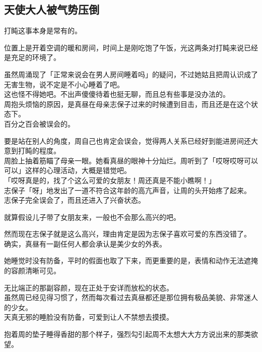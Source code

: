 \subsection{天使大人被气势压倒}

打盹这事本身是常有的。

位置上是开着空调的暖和房间，时间上是刚吃饱了午饭，光这两条对打盹来说已经是充足的环境了。

虽然周涌现了「正常来说会在男人房间睡着吗」的疑问，不过她姑且把周认识成了无害生物，说不定是不小心睡着了吧。\\

这也怪不得她吧。不出声傻傻待着也挺无聊，而且总有些事是没办法的。\\

周抱头烦恼的原因，是真昼在母亲志保子过来的时候遭到目击，而且还是在这个状态下。\\

百分之百会被误会的。

要是站在别人的角度，周自己也肯定会误会，觉得两人关系已经好到能进房间还大意到打盹的程度。\\

周脸上抽着筋瞄了母亲一眼。她看真昼的眼神十分灿烂。周听到了「哎呀哎呀可以可以」这样的心理活动，大概是错觉吧。\\

「哎呀真是的，找了个这么可爱的女朋友！周还真是不能小瞧啊！」\\

志保子「呀」地发出了一道不符合这年龄的高亢声音，让周的头开始疼了起来。\\

志保子完全误会了，而且还进入了兴奋状态。

就算假设儿子带了女朋友来，一般也不会那么高兴的吧。

然而现在志保子就是这么高兴，理由肯定是因为志保子喜欢可爱的东西没错了。\\

确实，真昼有一副任何人都会承认是美少女的外表。

她睡觉时没有防备，平时的假面也取了下来，而更重要的是，表情和动作无法遮掩的容颜清晰可见。

无比端正的那副容颜，现在正处于安详而放松的状态。\\

虽然周已经见得习惯了，然而每次看过去真昼都还是那位拥有极品美貌、非常迷人的少女。\\

天真无邪的睡脸没有防备，可爱到让人不禁想去摸摸。

抱着周的垫子睡得香甜的那个样子，强烈勾引起周不太想大大方方说出来的那类欲望。\\

